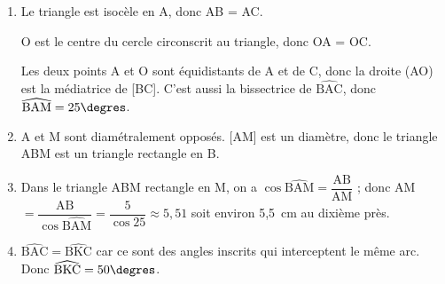 
\medskip

% 
%

\begin{enumerate}
\item %
Le triangle est isocèle en A, donc AB = AC.

O est le centre du cercle circonscrit au triangle, donc OA = OC.

Les deux points A et O sont équidistants de A et de C, donc la droite (AO) est la médiatrice de [BC]. C’est aussi la bissectrice de $\widehat{\text{BAC}}$, donc $\widehat{\text{BAM}} = 25\degres$.
\item %
A et M sont diamétralement opposés. [AM] est un diamètre, donc le triangle ABM est un triangle rectangle en B.
\item %
Dans le triangle ABM rectangle en M, on a $\cos   \widehat{\text{BAM}} = \dfrac{\text{AB}}{\text{AM}}$ ; donc AM $ = \dfrac{\text{AB}}{ \cos  \widehat{\text{BAM}}} = \dfrac{5}{ \cos 25} \approx 5,51$ soit environ 5,5~cm au dixième près.
\item %
$\widehat{\text{BAC}} = \widehat{\text{BKC}}$ car ce sont des angles inscrits qui interceptent le même arc. Donc $\widehat{\text{BKC}} = 50\degres$.

\end{enumerate}

\bigskip

